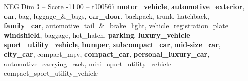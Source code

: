 \begin{textsample}{NEG Dim 3 – Score -11.00 – t000567}  \label{ex:f3_neg_008}
\textbf{motor\_vehicle}, \textbf{automotive\_exterior}, \textbf{car}, bag, luggage\_\&\_bags, \textbf{car\_door}, backpack, trunk, hatchback, \textbf{family\_car}, automotive\_tail\_\&\_brake\_light, vehicle\_registration\_plate, \textbf{windshield}, baggage, hot\_hatch, \textbf{parking}, \textbf{luxury\_vehicle}, \textbf{sport\_utility\_vehicle}, \textbf{bumper}, \textbf{subcompact\_car}, \textbf{mid-size\_car}, \textbf{city\_car}, compact\_mpv, \textbf{compact\_car}, \textbf{personal\_luxury\_car}, automotive\_carrying\_rack, mini\_sport\_utility\_vehicle, compact\_sport\_utility\_vehicle

\end{textsample}
